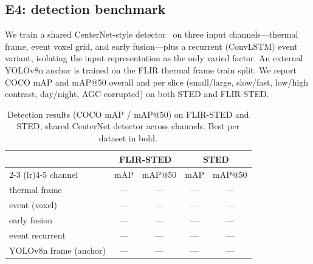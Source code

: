 \subsection{E4: detection benchmark}
\label{sec:e4}
We train a shared CenterNet-style detector~\cite{zhou2019centernet} on
three input channels---thermal frame, event voxel grid, and early
fusion---plus a recurrent (ConvLSTM) event variant, isolating the input
representation as the only varied factor. An external YOLOv8n anchor is
trained on the FLIR thermal frame train split. We report COCO mAP and
mAP@50 overall and per slice (small/large, slow/fast, low/high contrast,
day/night, AGC-corrupted) on both STED and FLIR-STED.
\begin{table}[t]
\centering
\caption{Detection results (COCO mAP / mAP@50) on FLIR-STED and STED,
shared CenterNet detector across channels. Best per dataset in bold.}
\label{tab:e4}
\begin{tabular}{lcccc}
\toprule
 & \multicolumn{2}{c}{FLIR-STED} & \multicolumn{2}{c}{STED} \\
\cmidrule(lr){2-3} \cmidrule(lr){4-5}
channel & mAP & mAP@50 & mAP & mAP@50 \\
\midrule
thermal frame & --- & --- & --- & --- \\
event (voxel) & --- & --- & --- & --- \\
early fusion & --- & --- & --- & --- \\
event recurrent & --- & --- & --- & --- \\
\midrule
YOLOv8n frame (anchor) & --- & --- & --- & --- \\
\bottomrule
\end{tabular}
\end{table}

